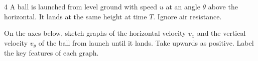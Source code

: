 \documentclass[12pt]{article}
\begin{document}
\begin{saq}{4}
A ball is launched from level ground with speed $u$ at an angle $\theta$ above the horizontal. It
lands at the same height at time $T$. Ignore air resistance.

On the axes below, sketch graphs of the horizontal velocity $v_x$ and the vertical velocity $v_y$ of
the ball from launch until it lands. Take upwards as positive. Label the key features of each graph.
\begin{center}
  \hspace{12mm}%
\end{center}
\end{saq}
\end{document}
